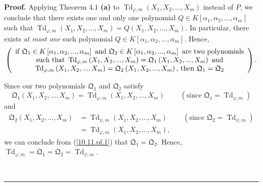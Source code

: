 \documentclass[numbers=enddot,12pt,final,onecolumn,notitlepage]{scrartcl}%
\newenvironment{proof}[1][Proof]{\noindent\textbf{#1.} }{\ \rule{0.5em}{0.5em}}
\begin{document}
\begin{proof}
Applying Theorem 4.1 \textbf{(a)} to $\operatorname*{Td}\nolimits_{\varphi
,m}\left(  X_{1},X_{2},...,X_{m}\right)  $ instead of $P$, we conclude that
there exists one and only one polynomial $Q\in K\left[  \alpha_{1},\alpha
_{2},...,\alpha_{m}\right]  $ such that $\operatorname*{Td}\nolimits_{\varphi
,m}\left(  X_{1},X_{2},...,X_{m}\right)  =Q\left(  X_{1},X_{2},...,X_{m}%
\right)  $. In particular, there exists \textit{at most one} such polynomial
$Q\in K\left[  \alpha_{1},\alpha_{2},...,\alpha_{m}\right]  $. Hence,
\begin{equation}
\left(
\begin{array}
[c]{c}%
\text{if }\mathfrak{Q}_{1}\in K\left[  \alpha_{1},\alpha_{2},...,\alpha
_{m}\right]  \text{ and }\mathfrak{Q}_{2}\in K\left[  \alpha_{1},\alpha
_{2},...,\alpha_{m}\right]  \text{ are two polynomials}\\
\text{such that }\operatorname*{Td}\nolimits_{\varphi,m}\left(  X_{1}%
,X_{2},...,X_{m}\right)  =\mathfrak{Q}_{1}\left(  X_{1},X_{2},...,X_{m}%
\right)  \text{ and}\\
\operatorname*{Td}\nolimits_{\varphi,m}\left(  X_{1},X_{2},...,X_{m}\right)
=\mathfrak{Q}_{2}\left(  X_{1},X_{2},...,X_{m}\right)  \text{, then
}\mathfrak{Q}_{1}=\mathfrak{Q}_{2}%
\end{array}
\right)  . \label{10.11.pf.1}%
\end{equation}


Since our two polynomials $\mathfrak{Q}_{1}$ and $\mathfrak{Q}_{2}$ satisfy%
\[
\mathfrak{Q}_{1}\left(  X_{1},X_{2},...,X_{m}\right)  =\operatorname*{Td}%
\nolimits_{\varphi,m}\left(  X_{1},X_{2},...,X_{m}\right)
\ \ \ \ \ \ \ \ \ \ \left(  \text{since }\mathfrak{Q}_{1}=\operatorname*{Td}%
\nolimits_{\varphi,m}\right)
\]
and%
\begin{align*}
\mathfrak{Q}_{2}\left(  X_{1},X_{2},...,X_{m}\right)   &  =\operatorname*{Td}%
\nolimits_{\psi,m}\left(  X_{1},X_{2},...,X_{m}\right)
\ \ \ \ \ \ \ \ \ \ \left(  \text{since }\mathfrak{Q}_{2}=\operatorname*{Td}%
\nolimits_{\psi,m}\right) \\
&  =\operatorname*{Td}\nolimits_{\varphi,m}\left(  X_{1},X_{2},...,X_{m}%
\right)  ,
\end{align*}
we can conclude from (\ref{10.11.pf.1}) that $\mathfrak{Q}_{1}=\mathfrak{Q}%
_{2}$. Hence, $\operatorname*{Td}\nolimits_{\varphi,m}=\mathfrak{Q}%
_{1}=\mathfrak{Q}_{2}=\operatorname*{Td}\nolimits_{\psi,m}$.


\end{proof}
\end{document}
